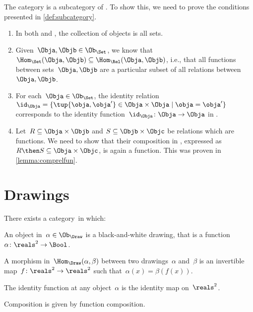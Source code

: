 \begin{example}
  The category \Set is a subcategory of \Rel. To show this, we need to prove the conditions presented in \cref{def:subcategory}.
  \begin{enumerate}
    \item In both \Rel and \Set, the collection of objects is all sets.
    \item Given~$\Obja,\Objb\in \Ob_{\Set}$, we know that~$\Hom_{\Set}(\Obja,\Objb)\subseteq \Hom_{\Rel}(\Obja,\Objb)$, i.e., that all functions between sets~$\Obja,\Objb$ are a particular subset of all relations between~$\Obja,\Objb$.
    \item For each~$\Obja \in \Ob_{\Set}$, the identity relation~$\id_\Obja=\{\tup{\obja,\obja'}\in \Obja\times \Obja \mid \obja=\obja'\}$ corresponds to the identity function~$\id_\Obja \colon \Obja \to \Obja$ in \Set.
    \item Let~$R\subseteq \Obja\times \Objb$ and $S\subseteq \Objb \times \Objc$ be relations which are functions. We need to show that their composition in \Rel, expressed as~$R\then S\subseteq \Obja\times \Objc$, is again a function. This was proven in \cref{lemma:comprelfun}.
  \end{enumerate}

\end{example}

\section{Drawings}

\begin{definition}[Drawings]
  There exists a category~\Draw in which:
  \begin{compactenum}
    \item An object in~$\alpha\in \Ob_\Draw$ is a black-and-white drawing,
    that is a function~$\alpha \colon \reals^2 \to \Bool$.
    \item A morphism in~$\Hom_{\Draw}(\alpha, \beta)$ between two drawings~$\alpha$ and~$\beta$ is an invertible map~$f\colon \reals^2 \to \reals^2$ such that~$\alpha(x) = \beta(f(x))$.
    \item The identity function at any object~$\alpha$ is the identity map
    on~$\reals^2$.
    \item Composition is given by function composition.
  \end{compactenum}
\end{definition}

